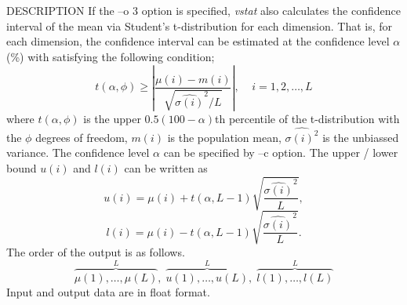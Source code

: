\begin{qsection}{DESCRIPTION}
If the --o 3 option is specified, {\em vstat} also calculates the confidence
interval of the mean via Student's t-distribution for each dimension.
That is, for each dimension, the confidence interval can be estimated
at the confidence level $\alpha$ (\%) with satisfying the following condition;
 \begin{displaymath}
  t(\alpha, \phi) \geq
  \left| \frac{\mu(i) -m(i)}{\sqrt{\hat{\sigma(i)}^{2} / L} }\right|
  ,   \;\;\;\; i = 1,  2, \dots, L
 \end{displaymath}
where $t(\alpha, \phi)$ is the upper $0.5(100 - \alpha)$th percentile
of the t-distribution with the  $\phi$ degrees of freedom,
$m(i)$ is the population mean, $\hat{\sigma(i)^{2}}$ is the unbiassed variance.
The confidence level $\alpha$ can be specified by --c option.
The upper / lower bound $u(i)$ and $l(i)$ can be written as
 \begin{displaymath}
  u(i) = \mu(i) + t(\alpha, L - 1) \sqrt{\frac{\hat{\sigma(i)}^{2}}{L}},
 \end{displaymath}
 \begin{displaymath}
  l(i) = \mu(i) - t(\alpha, L - 1) \sqrt{\frac{\hat{\sigma(i)}^{2}}{L}}.
 \end{displaymath}
The order of the output is as follows.
 \begin{displaymath}
  \overbrace{\mu(1),\dots,\mu(L)}^L, \; \overbrace{u(1),\dots,u(L)}^L,
    \;\overbrace{l(1),\dots,l(L)}^L
 \end{displaymath}
Input and output data are in float format.
\end{qsection}

\begin{options}
\end{options}

